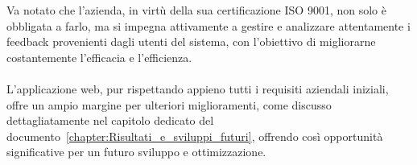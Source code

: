 Va notato che l'azienda, in virtù della sua certificazione ISO 9001, non solo è obbligata a farlo, 
ma si impegna attivamente a gestire e analizzare attentamente i feedback provenienti dagli utenti del sistema, 
con l'obiettivo di migliorarne costantemente l'efficacia e l'efficienza.
\\ \\
L'applicazione web, pur rispettando appieno tutti i requisiti aziendali iniziali, 
offre un ampio margine per ulteriori miglioramenti, come discusso dettagliatamente nel capitolo dedicato del documento~\ref{chapter:Risultati_e_sviluppi_futuri}, 
offrendo così opportunità significative per un futuro sviluppo e ottimizzazione.